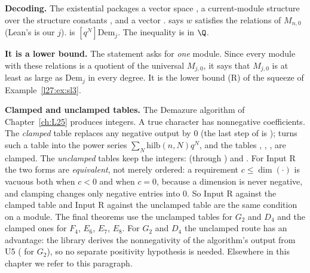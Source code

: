 \begin{dictionary}
\textbf{Decoding.} The existential packages a vector space , a current-module structure  over the structure
constants , and a vector .  says $w$ satisfies the relations of $M_{n,0}$
(Lean's  is our $j$).  is $[q^N]\mathrm{Dem}_j$. The inequality is in $\Q$.

\textbf{It is a lower bound.} The statement asks for \emph{one} module. Since every module with these relations is a quotient
of the universal $M_{j,0}$, it says that $M_{j,0}$ is at least as large as $\mathrm{Dem}_j$ in every degree. It is the lower
bound (R) of the squeeze of Example~\ref{l27:ex:sl3}.

\textbf{Clamped and unclamped tables.} The Demazure algorithm of Chapter~\ref{ch:L25} produces integers. A true character has
nonnegative coefficients. The \emph{clamped} table replaces any negative output by $0$ (the last step of
 is );  turns such a table into the power series
$\sum_N\mathrm{hilb}(n,N)q^N$, and the tables , , ,
 are clamped. The \emph{unclamped} tables keep the integers:  (through ) and
. For Input R the two forms are \emph{equivalent}, not merely ordered: a requirement
$c\le\dim(\cdot)$ is vacuous both when $c<0$ and when $c=0$, because a dimension is never negative, and clamping changes only
negative entries into $0$. So Input R against the clamped table and Input R against the unclamped table are the same
condition on a module. The final theorems use the unclamped
tables for $G_2$ and $D_4$ and the clamped ones for $F_4$, $E_6$, $E_7$, $E_8$. For $G_2$ and $D_4$ the unclamped route has an
advantage: the library derives the nonnegativity of the algorithm's output from U5 ( for $G_2$),
so no separate positivity hypothesis is needed. Elsewhere in this chapter we refer to this paragraph.


\end{dictionary}
